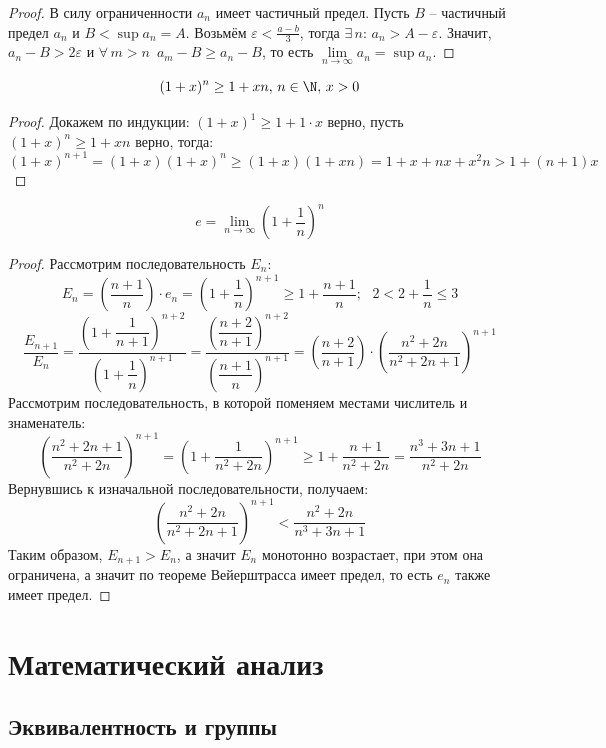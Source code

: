\documentclass[12pt]{article}
\begin{document}
\begin{proof}
    В силу ограниченности $a_n$ имеет частичный предел. Пусть $B$ -- частичный предел $a_n$ и $B<\sup a_n=A$. Возьмём $\varepsilon<\frac{a-b}{3}$, тогда $\exists\,n:\,a_n>A-\varepsilon$. Значит, $a_n-B>2\varepsilon$ и $\forall\,m>n\enspace a_m-B\geq a_n-B$, то есть $\lim\limits_{n\to\infty}a_n=\sup a_n$.
\end{proof}
\begin{lemma}
    $$(1+x)^n\geq 1+xn,\,n\in \N,\,x>0$$
\end{lemma}
\begin{proof}
    Докажем по индукции: $(1+x)^1\geq 1+1\cdot x$ верно, пусть $(1+x)^n\geq 1+xn$ верно, тогда:
    $$(1+x)^{n+1}=(1+x)(1+x)^n\geq (1+x)(1+xn)=1+x+nx+x^2n>1+(n+1)x$$
\end{proof}
\begin{definition}
    $$e=\lim_{n\to \infty}\left(1+\dfrac{1}{n}\right)^n$$
\end{definition}
\begin{proof}
    Рассмотрим последовательность $E_n$:
    $$E_n=\left(\dfrac{n+1}{n}\right)\cdot e_n=\left(1+\dfrac{1}{n}\right)^{n+1}\geq 1+\dfrac{n+1}{n};\enspace \,2<2+\frac{1}{n}\leq3$$
    $$\dfrac{E_{n+1}}{E_n}=\dfrac{\left(1+\dfrac{1}{n+1}\right)^{n+2}}{\left(1+\dfrac{1}{n}\right)^{n+1}}=\dfrac{\left(\dfrac{n+2}{n+1}\right)^{n+2}}{\left(\dfrac{n+1}{n}\right)^{n+1}}=\left(\dfrac{n+2}{n+1}\right)\cdot\left(\dfrac{n^2+2n}{n^2+2n+1}\right)^{n+1}$$
    Рассмотрим последовательность, в которой поменяем местами числитель и знаменатель:
    $$\left(\dfrac{n^2+2n+1}{n^2+2n}\right)^{n+1}=\left(1+\dfrac{1}{n^2+2n}\right)^{n+1}\geq1+\dfrac{n+1}{n^2+2n}=\dfrac{n^3+3n+1}{n^2+2n}$$
    Вернувшись к изначальной последовательности, получаем:
    $$\left(\dfrac{n^2+2n}{n^2+2n+1}\right)^{n+1}<\dfrac{n^2+2n}{n^3+3n+1}$$
    Таким образом, $E_{n+1}>E_n$, а значит $E_n$ монотонно возрастает, при этом она ограничена, а значит по теореме Вейерштрасса имеет предел, то есть $e_n$ также имеет предел.
\end{proof}

\section{Математический анализ}

\subsection{Эквивалентность и группы}
\end{document}
